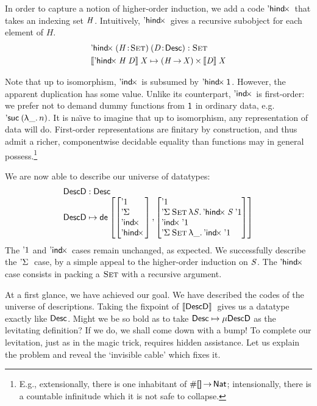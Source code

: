 In order to capture a notion of higher-order induction, we add a code
$\DHindx{\!}{\!}$ that takes an indexing set $\V{H}$. Intuitively,
$\DHindx{\!}{\!}$ gives a recursive subobject for each element of $H$.
%
\[\stk{
    \DHindx{(\Bhab{\M{H}}{\Set})}{(\Bhab{\M{D}}{\Desc})} : \Set \smallskip \\
\descop{\DHindx{\V{H}}{\V{D}}}{\V{X}}     \mapsto \TIMES{(\V{H} \To \V{X})}{\descop{\V{D}}{\V{X}}} \\
}\]


Note that up to isomorphism, $\DIndx{\!}$ is subsumed by
$\DHindx{\Unit}{\!}$. However, the apparent duplication has some
value.  Unlike its counterpart, $\DIndx{\!}$ is first-order: we prefer
not to demand dummy functions from \(\Unit\) in ordinary data,
e.g. \(\NatSuc{(\LAM{\_}n)}\). It is na{\"\i}ve to imagine that up to
isomorphism, any representation of data will do.  First-order
representations are finitary by construction, and thus admit a richer,
componentwise decidable equality than functions may in
general possess.\footnote{E.g., extensionally, there is one inhabitant of
\(\EnumT{\void}\To\Nat\); intensionally, there is a countable infinitude
which it is not safe to collapse.}

We are now able to describe our universe of datatypes:
%
\[\stk{
\DescD : \Desc \\
\DescD \mapsto\tada
{\stkm{ \DUnit\\ \DSigma{\!}{\!}\\ \DIndx{\!}\\ \DHindx{\!}{\!}}}
{\stkm{
\DUnit                                            \\
                                   \DSigma{\Set}{\LAM{\V{S}} \DHindx{\V{S}}{\DUnit}}   \\
                                   \DIndx{\DUnit}                                    \\
                                   \DSigma{\Set}{\LAM{\_} \DIndx{\DUnit}}
}}
}\]
%
The $\DUnit$ and $\DIndx{\!}$ cases remain unchanged, as expected. We
successfully describe the $\DSigma{\!}{}$ case, by a simple appeal to
the higher-order induction on $\V{S}$. The $\DHindx{\!}{\!}$ case
consists in packing a $\Set$ with a recursive argument.

At a first glance, we have achieved our goal. We have described the
codes of the universe of descriptions. Taking the fixpoint of \(\descop{\DescD}\)
gives us a datatype exactly like $\Desc$. Might we be
so bold as to take \(\Desc \mapsto \Mu{\DescD}\) as the levitating
definition? If we do, we shall come down with a bump! 
To complete our levitation, just as in the magic trick, requires
hidden assistance. Let us explain the problem and reveal the `invisible
cable' which fixes it.


